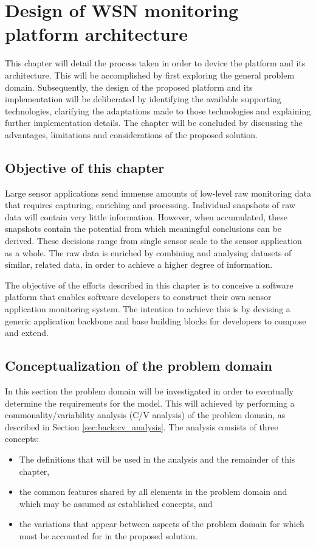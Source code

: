 \newcommand{\archid}{1}
\chapter{Design of WSN monitoring platform architecture}
\label{ch:architecture}
This chapter will detail the process taken in order to device the platform and its architecture. This will be accomplished by first exploring the general problem domain. Subsequently, the design of the proposed platform and its implementation will be deliberated by identifying the available supporting technologies, clarifying the adaptations made to those technologies and explaining further implementation details. The chapter will be concluded by discussing the advantages, limitations and considerations of the proposed solution.
\section{Objective of this chapter}
Large sensor applications send immense amounts of low-level raw monitoring data that requires capturing, enriching and processing. Individual snapshots of raw data will contain very little information. However, when accumulated, these snapshots contain the potential from which meaningful conclusions can be derived. These decisions range from single sensor scale to the sensor application as a whole. The raw data is enriched by combining and analysing datasets of similar, related data, in order to achieve a higher degree of information.

The objective of the efforts described in this chapter is to conceive a software platform that enables software developers to construct their own sensor application monitoring system. The intention to achieve this is by devising a generic application backbone and base building blocks for  developers to compose and extend.
\section{Conceptualization of the problem domain}
In this section the problem domain will be investigated in order to eventually determine the requirements for the model. This will achieved by performing a commonality/variability analysis (C/V analysis) of the problem domain, as described in Section \ref{sec:back:cv_analysis}. The analysis consists of three concepts:
\begin{itemize}
\nospace
\item The definitions that will be used in the analysis and the remainder of this chapter,
\item the common features shared by all elements in the problem domain and which may be assumed as established concepts, and
\item the variations that appear between aspects of the problem domain for which must be accounted for in the proposed solution.
\end{itemize}
